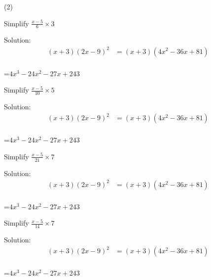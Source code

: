 \clearpage



\begin{mtask}[resume](2)
   \task \begin{exercise} Simplify $\frac{x-5}{6}\times 3$
              \begin{envSolution}
			      Solution:
			      \begin{align*}
			        (x+3)(2x-9)^2  &= (x+3)(4x^2-36x+81)                      \\[10pt]    
				 \end{align*}
                 \begin{shortsolution}  
				       =$4x^3-24x^2-27x+243$
			     \end{shortsolution}				 
               \end{envSolution}
         \end{exercise}

   \task \begin{exercise} Simplify $\frac{x-5}{10}\times 5$
              \begin{envSolution}
			      Solution:
			      \begin{align*}
			        (x+3)(2x-9)^2  &= (x+3)(4x^2-36x+81)                      \\[10pt]    
				 \end{align*}
                 \begin{shortsolution}  
				       =$4x^3-24x^2-27x+243$
			     \end{shortsolution}				 
               \end{envSolution}
         \end{exercise}

   \task \begin{exercise} Simplify $\frac{x-5}{21}\times 7$
              \begin{envSolution}
			      Solution:
			      \begin{align*}
			        (x+3)(2x-9)^2  &= (x+3)(4x^2-36x+81)                      \\[10pt]    
				 \end{align*}
                 \begin{shortsolution}  
				       =$4x^3-24x^2-27x+243$
			     \end{shortsolution}				 
               \end{envSolution}
         \end{exercise}


   \task \begin{exercise} Simplify $\frac{x-5}{14}\times 7$
              \begin{envSolution}
			      Solution:
			      \begin{align*}
			        (x+3)(2x-9)^2  &= (x+3)(4x^2-36x+81)                      \\[10pt]    
				 \end{align*}
                 \begin{shortsolution}  
				       =$4x^3-24x^2-27x+243$
			     \end{shortsolution}				 
               \end{envSolution}
         \end{exercise}


\end{mtask}
